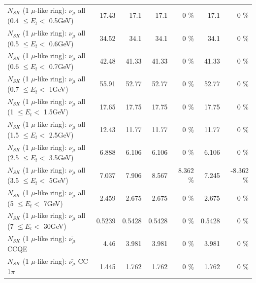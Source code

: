 \begin{table}
\begin{tabular}{| l | r | r | r  r | r  r |}
       $N_{SK}$ (1 $\mu$-like ring): $\nu_{\mu}$ all (0.4 $\leq E_{t} <$ 0.5GeV) &           17.43 &            17.1 &            17.1 &        0 \%  &            17.1 &        0 \%  \\ 
       $N_{SK}$ (1 $\mu$-like ring): $\nu_{\mu}$ all (0.5 $\leq E_{t} <$ 0.6GeV) &           34.52 &            34.1 &            34.1 &        0 \%  &            34.1 &        0 \%  \\ 
       $N_{SK}$ (1 $\mu$-like ring): $\nu_{\mu}$ all (0.6 $\leq E_{t} <$ 0.7GeV) &           42.48 &           41.33 &           41.33 &        0 \%  &           41.33 &        0 \%  \\ 
         $N_{SK}$ (1 $\mu$-like ring): $\nu_{\mu}$ all (0.7 $\leq E_{t} <$ 1GeV) &           55.91 &           52.77 &           52.77 &        0 \%  &           52.77 &        0 \%  \\ 
         $N_{SK}$ (1 $\mu$-like ring): $\nu_{\mu}$ all (1 $\leq E_{t} <$ 1.5GeV) &           17.65 &           17.75 &           17.75 &        0 \%  &           17.75 &        0 \%  \\ 
       $N_{SK}$ (1 $\mu$-like ring): $\nu_{\mu}$ all (1.5 $\leq E_{t} <$ 2.5GeV) &           12.43 &           11.77 &           11.77 &        0 \%  &           11.77 &        0 \%  \\ 
       $N_{SK}$ (1 $\mu$-like ring): $\nu_{\mu}$ all (2.5 $\leq E_{t} <$ 3.5GeV) &           6.888 &           6.106 &           6.106 &        0 \%  &           6.106 &        0 \%  \\ 
         $N_{SK}$ (1 $\mu$-like ring): $\nu_{\mu}$ all (3.5 $\leq E_{t} <$ 5GeV) &           7.037 &           7.906 &           8.567 &    8.362 \%  &           7.245 &   -8.362 \%  \\ 
           $N_{SK}$ (1 $\mu$-like ring): $\nu_{\mu}$ all (5 $\leq E_{t} <$ 7GeV) &           2.459 &           2.675 &           2.675 &        0 \%  &           2.675 &        0 \%  \\ 
          $N_{SK}$ (1 $\mu$-like ring): $\nu_{\mu}$ all (7 $\leq E_{t} <$ 30GeV) &          0.5239 &          0.5428 &          0.5428 &        0 \%  &          0.5428 &        0 \%  \\ 
\hline
\hline
\hline
                              $N_{SK}$ (1 $\mu$-like ring): $\bar{\nu_\mu}$ CCQE &            4.46 &           3.981 &           3.981 &        0 \%  &           3.981 &        0 \%  \\ 
                         $N_{SK}$ (1 $\mu$-like ring): $\bar{\nu_\mu}$ CC 1$\pi$ &           1.445 &           1.762 &           1.762 &        0 \%  &           1.762 &        0 \%  \\ 

\end{tabular}
\end{table}
